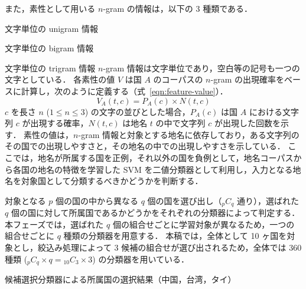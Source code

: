 \documentclass[japanese]{jnlp_1.4}
\renewenvironment{itemize}{}{}
\begin{document}
また，素性として用いる $n$-gram の情報は，以下の 3 種類である．
\begin{itemize}
 \item[(FN1)] 文字単位の unigram 情報 
 \item[(FN2)] 文字単位の bigram 情報 
 \item[(FN3)] 文字単位の trigram 情報 
\end{itemize}
$n$-gram 情報は文字単位であり，空白等の記号も一つの文字としている．
各素性の値 $V$ は国 $A$ のコーパスの $n$-gram の出現確率をベースに計算し，次のように定義する（式~\ref{eqn:feature-value}）．
\begin{equation}
 V_{A}(t,c) = P_{A}(c) \times N(t,c) \label{eqn:feature-value}
\end{equation}
$c$ を長さ $n$ ($1 \le n \le 3$) の文字の並びとした場合，$P_{A}(c)$ は国 $A$ における文字列 $c$ が出現する確率，$N(t,c)$ は地名 $t$ の中で文字列 $c$ が出現した回数を示す．
素性の値は，$n$-gram 情報と対象とする地名に依存しており，ある文字列のその国での出現しやすさと，その地名の中での出現しやすさを示している．
ここでは，地名が所属する国を正例，それ以外の国を負例として，地名コーパスから各国の地名の特徴を学習した SVM を二値分類器として利用し，入力となる地名を対象国として分類するべきかどうかを判断する．

対象となる $p$ 個の国の中から異なる $q$ 個の国を選び出し（${}_{p}C_{q}$ 通り），選ばれた $q$ 個の国に対して所属国であるかどうかをそれぞれの分類器によって判定する．
本フェーズでは，選ばれた $q$ 個の組合せごとに学習対象が異なるため，一つの組合せごとに $q$ 種類の分類器を用意する．
本稿では，全体として 10 ヶ国を対象とし，絞込み処理によって 3 候補の組合せが選び出されるため，全体では 360 種類 (${}_{p}C_{q} \times q = {}_{10}C_{3} \times 3$) の分類器を用いている．

\begin{table}[b]
 \caption{候補選択分類器による所属国の選択結果（中国，台湾，タイ）}
 \label{tab:svm-output-chthtw}

\end{table}
\end{document}
